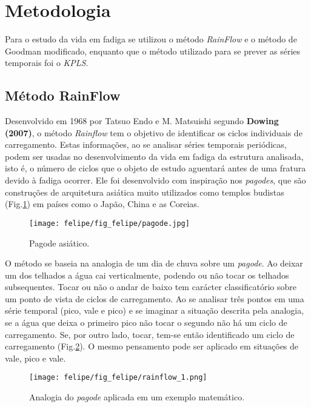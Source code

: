 \section{Metodologia}

Para o estudo da vida em fadiga se utilizou o método \emph{RainFlow} e o método de Goodman modificado, enquanto que o método utilizado para se prever as séries temporais foi o \emph{KPLS}. 

\subsection{Método RainFlow}\label{rainflow}
Desenvolvido em 1968 por Tatsuo Endo e M. Matsuishi segundo \textbf{Dowing (2007)}, o método \emph{Rainflow} tem o objetivo de identificar os ciclos individuais de carregamento. Estas informações, ao se analisar séries temporais periódicas, podem ser usadas no desenvolvimento da vida em fadiga da estrutura analisada, isto é, o número de ciclos que o objeto de estudo aguentará antes de uma fratura devido à fadiga ocorrer. Ele foi desenvolvido com inspiração nos \emph{pagodes}, que são construções de arquitetura asiática muito utilizados como templos budistas (Fig.\ref{pagode}) em países como o Japão, China e as Coreias. 

\begin{figure}[!ht]
    \centering
    \texttt{[image: felipe/fig\_felipe/pagode.jpg]}
    \caption{Pagode asiático.}
    \label{pagode}
\end{figure}

O método se baseia na analogia de um dia de chuva sobre um \emph{pagode}. Ao deixar um dos telhados a água cai verticalmente, podendo ou não tocar os telhados subsequentes. Tocar ou não o andar de baixo tem carácter classificatório sobre um ponto de vista de ciclos de carregamento. Ao se analisar três pontos em uma série temporal (pico, vale e pico) e se imaginar a situação descrita pela analogia, se a água que deixa o primeiro pico não tocar o segundo não há um ciclo de carregamento. Se, por outro lado, tocar, tem-se então identificado um ciclo de carregamento (Fig.\ref{rain_flow_1}). O mesmo pensamento pode ser aplicado em situações de vale, pico e vale.

\begin{figure}[!ht]
    \centering
    \texttt{[image: felipe/fig\_felipe/rainflow\_1.png]}
    \caption{Analogia do \emph{pagode} aplicada em um exemplo matemático.}
    \label{rain_flow_1}
\end{figure}

